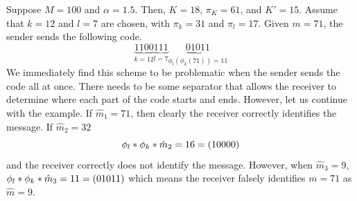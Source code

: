 \documentclass{article}
\begin{document}
\begin{example}
	Suppose \(M = 100\) and \(\alpha = 1.5\). Then, \(K = 18\), \(\pi_K = 61\), and \(K' = 15\). Assume that \(k = 12\) and \(l = 7\) are chosen, with \(\pi_k = 31\) and \(\pi_l = 17\). Given \(m = 71\), the sender sends the following code. 
	\begin{equation*}
		\underbrace{1100}_{k = 12} \underbrace{111}_{l = 7} \underbrace{01011}_{\phi_l(\phi_k(71)) = 11}
	\end{equation*}
	We immediately find this scheme to be problematic when the sender sends the code all at once. There needs to be some separator that allows the receiver to determine where each part of the code starts and ends. However, let us continue with the example. If \(\hat{m}_1 = 71\), then clearly the receiver correctly identifies the message. If \(\hat{m}_2 = 32\) 
	\begin{equation*}
		\func{\phi_l}{\func{\phi_k}{\hat{m}_2}} = 16 = (10000)
	\end{equation*}
	and the receiver correctly does not identify the message. However, when \(\hat{m}_3 = 9\), \(\func{\phi_l}{\func{\phi_k}{\hat{m}_3}}= 11 = (01011)\) which means the receiver falsely identifies \(m = 71\) as \(\hat{m} = 9\).
\end{example}
\end{document}
